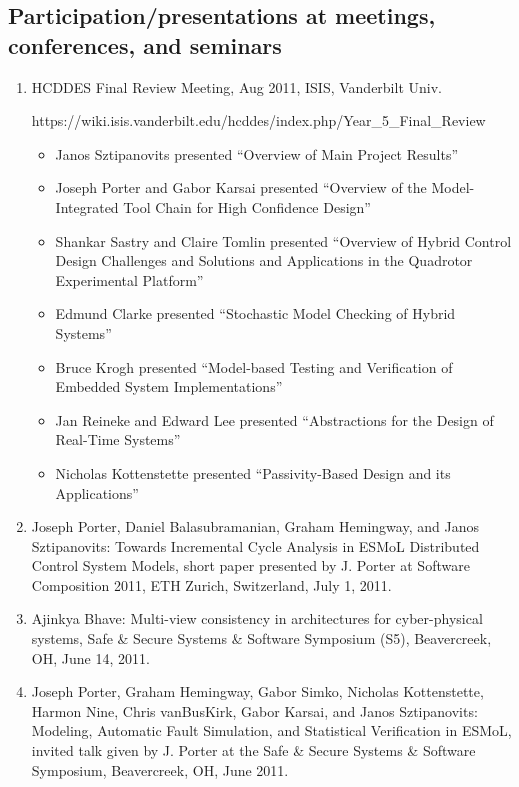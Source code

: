 \subsection{Participation/presentations at meetings, conferences, and seminars}

\begin{enumerate}
\item HCDDES Final Review Meeting, Aug 2011, ISIS, Vanderbilt Univ. 

https://wiki.isis.vanderbilt.edu/hcddes/index.php/Year\_5\_Final\_Review

\begin{itemize}
\item Janos Sztipanovits presented ``Overview of Main Project Results''
\item Joseph Porter and Gabor Karsai presented ``Overview of the Model-Integrated Tool Chain for High Confidence Design''
\item Shankar Sastry and Claire Tomlin presented ``Overview of Hybrid Control Design Challenges and Solutions and Applications in the Quadrotor Experimental Platform''
\item Edmund Clarke presented ``Stochastic Model Checking of Hybrid Systems''
\item Bruce Krogh presented ``Model-based Testing and Verification of Embedded System Implementations''
\item Jan Reineke and Edward Lee presented ``Abstractions for the Design of Real-Time Systems''
\item Nicholas Kottenstette presented ``Passivity-Based Design and its Applications''
\end{itemize}
\item Joseph Porter, Daniel Balasubramanian, Graham Hemingway, and Janos Sztipanovits: Towards Incremental Cycle Analysis in ESMoL Distributed Control System Models, short paper presented by J. Porter at Software Composition 2011, ETH Zurich, Switzerland, July 1, 2011.
\item Ajinkya Bhave: Multi-view consistency in architectures for cyber-physical systems, Safe \& Secure Systems \& Software Symposium (S5), Beavercreek, OH, June 14, 2011.
\item Joseph Porter, Graham Hemingway, Gabor Simko, Nicholas Kottenstette, Harmon Nine, Chris vanBusKirk, Gabor Karsai, and Janos Sztipanovits: Modeling, Automatic Fault Simulation, and Statistical Verification in ESMoL, invited talk given by J. Porter at the Safe \& Secure Systems \& Software Symposium, Beavercreek, OH, June 2011.

\end{enumerate}
